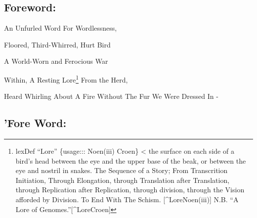 \documentclass[
]{article}
\begin{document}
\subsection{Foreword:}\label{foreword}

An Unfurled Word For Wordlessness,

Floored, Third-Whirred, Hurt Bird

A World-Worn and Ferocious War

Within, A Resting Lore\footnote{lexDef ``Lore'' \{usage:::
  Noen(i\textbar ii) \textbar\textbar{} Croen\} \textless{} the surface
  on each side of a bird's head between the eye and the upper base of
  the beak, or between the eye and nostril in snakes. \textbar{} The
  Sequence of a Story; From Transcrition Initiation, Through Elongation,
  through Translation after Translation, through Replication after
  Replication, through division, through the Vision afforded by
  Division. To End With The Schism. {[}\^{}LoreNoen(i\textbar ii){]}
  \textbar\textbar{} N.B. ``A Lore of Genomes.''{[}\^{}LoreCroen{]}}
From the Herd,

Heard Whirling About A Fire Without The Fur We Were Dressed In -

\subsection{'Fore Word:}\label{fore-word}
\end{document}
